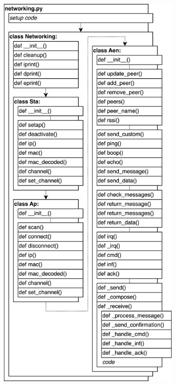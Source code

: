 \begin{figure}[H]
	\centering%
    \begin{subfigure}[b]{0.45\textwidth}%
      	\includegraphics[width=\textwidth]{overleaf/images/networking_structure.drawio.png}%

\end{subfigure}
\end{figure}
